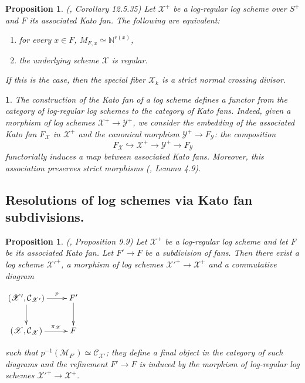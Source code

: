 \documentclass{amsart}%
\numberwithin{equation}{subsection}
\theoremstyle{plain2}
\newtheorem{prop}[equation]{Proposition}
\theoremstyle{definition2}
\theoremstyle{stepstyle}
\theoremstyle{point}
\theoremstyle{subpoint}
\newtheorem{subpoint}[equation]{}%
\newcommand{\spa}[1]{\begin{subpoint}#1\end{subpoint}}           %
\newcommand{\N}{\ensuremath{\mathbb{N}}}
\newcommand{\cX}{\ensuremath{\mathscr{X}}}
\newcommand{\caM}{\ensuremath{\mathcal{M}}}
\newcommand{\caC}{\ensuremath{\mathcal{C}}}
\newcommand{\cY}{\ensuremath{\mathscr{Y}}}
\renewcommand{\cY}{\ensuremath{\mathscr{Y}}}
\begin{document}
\begin{prop} \label{resolution log scheme kato fan} (\cite{GabberRamero}, Corollary 12.5.35)
Let $\cX^+$ be a log-regular log scheme over $S^+$ and $F$ its associated Kato fan. The following are equivalent: \begin{enumerate}
\item for every $x \in F$, $M_{F,x} \simeq \N^{r(x)}$,
\item the underlying scheme $\cX$ is regular.
\end{enumerate}
If this is the case, then the special fiber $\cX_k$ is a strict normal crossing divisor.
\end{prop}
\spa{The construction of the Kato fan of a log scheme defines a functor from the category of log-regular log schemes to the category of Kato fans. Indeed, given a morphism of log schemes $\cX^+ \rightarrow \cY^+$, we consider the embedding of the associated Kato fan $F_{\cX}$ in $\cX^+$ and the canonical morphism $\cY^+ \rightarrow F_{\cY}$: the composition $$F_{\cX} \hookrightarrow \cX^+ \rightarrow \cY^+ \rightarrow F_\cY$$ functorially induces a map between associated Kato fans. Moreover, this association preserves strict morphisms (\cite{Ulirsch}, Lemma 4.9).}
\subsection{Resolutions of log schemes via Kato fan subdivisions.} \label{section resolution via kato subd}
\begin{prop} (\cite{Kato1994a}, Proposition 9.9) \label{prop morphism induced by subdivision kato fan}
Let $\cX^+$ be a log-regular log scheme and let $F$ be its associated Kato fan. Let $F' \rightarrow F$ be a subdivision of fans. Then there exist a log scheme ${\cX'}^+$, a morphism of log schemes ${\cX'}^+ \rightarrow \cX^+$ and a commutative diagram
\begin{center}
$\begin{gathered}
\xymatrixcolsep{2pc} \xymatrix{
  (\cX', \caC_{\cX'}) \ar[r]^-{p} \ar[d]^{} & F' \ar[d]^{}\\
  (\cX, \caC_{\cX}) \ar[r]^-{\pi_{\cX}}   & F
}
\end{gathered}$\end{center}such that $p^{-1}(\caM_{F'}) \simeq \caC_{\cX'}$; they define a final object in the category of such diagrams and the refinement $F'\to F$ is induced by the morphism of log-regular log schemes $\cX'^+ \rightarrow \cX^+$.
\end{prop}
\end{document}
